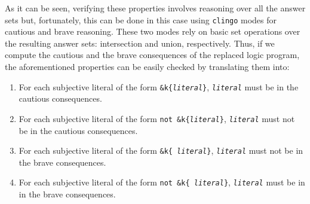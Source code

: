 \documentclass{new_tlp}
\newcommand{\textapprox}{\raisebox{0.5ex}{\texttildelow}}
\def\clingo{{\tt clingo}}
\begin{document}
As it can be seen, verifying these properties involves reasoning over all the answer sets but, fortunately, this can be done in this case using
\clingo{} modes for cautious and brave reasoning.
These two modes rely on basic set operations over the resulting answer sets: intersection and union, respectively.
Thus, if we compute the cautious and the brave consequences of the replaced logic program,
the aforementioned properties can be easily checked by translating them into:
\begin{enumerate}
    \item For each subjective literal of the form \texttt{\&k\{\emph{literal}\}}, \texttt{\emph{literal}} must be in the cautious consequences.

    \item For each subjective literal of the form \texttt{not \&k\{\emph{literal}\}}, \texttt{\emph{literal}} must not be in the cautious consequences.

    \item For each subjective literal of the form \texttt{\&k\{\textapprox\ \emph{literal}\}}, \texttt{\emph{literal}} must not be in the brave consequences.

    \item For each subjective literal of the form \texttt{not \&k\{\textapprox\ \emph{literal}\}}, \texttt{\emph{literal}} must be in in the brave consequences.
\end{enumerate}
\end{document}
